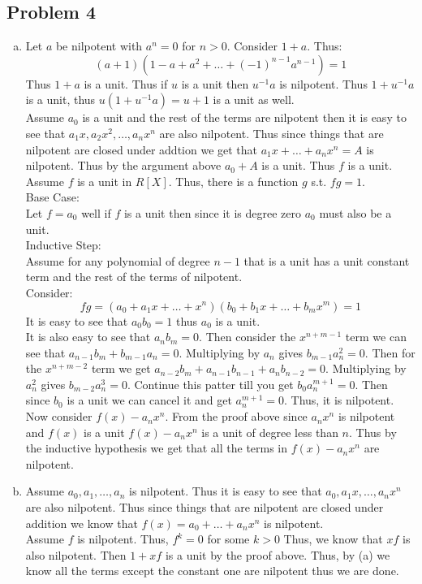 \documentclass[12pt, letterpaper]{article}
\theoremstyle{definition}
\begin{document}
\subsection*{Problem 4}
\begin{enumerate}[(a)]
    \item Let $a$ be nilpotent with $a^n=0$ for $n>0$. Consider $1+a$. Thus:
    \[(a+1)(1-a+a^2+\dots+(-1)^{n-1}a^{n-1})=1\]
    Thus $1+a$ is a unit. Thus if $u$ is a unit then $u^{-1}a$ is nilpotent. Thus $1+u^{-1}a$ is a unit, thus $u(1+u^{-1}a)=u+1$ is a unit as well.\\
    Assume $a_0$ is a unit and the rest of the terms are nilpotent then it is easy to see that $a_1x,a_2x^2,\dots,a_nx^n$ are also nilpotent. Thus since things that are nilpotent are closed under addtion we get that $a_1x+\dots+a_nx^n=A$ is nilpotent. Thus by the argument above $a_0+A$ is a unit. Thus $f$ is a unit.\\
    Assume $f$ is a unit in $R[X]$. Thus, there is a function $g$ s.t. $fg=1$.\\
    Base Case:\\
    Let $f=a_0$ well if $f$ is a unit then since it is degree zero $a_0$ must also be a unit.\\
    Inductive Step:\\
    Assume for any polynomial of degree $n-1$ that is a unit has a unit constant term and the rest of the terms of nilpotent.\\
    Consider:
    \[fg=(a_0+a_1x+\dots+x^n)(b_0+b_1x+\dots+b_mx^m)=1\]
    It is easy to see that $a_0b_0=1$ thus $a_0$ is a unit.\\
    It is also easy to see that $a_nb_m=0$. Then consider the $x^{n+m-1}$ term we can see that $a_{n-1}b_m+b_{m-1}a_n=0$. Multiplying by $a_n$ gives $b_{m-1}a_n^2=0$. Then for the $x^{n+m-2}$ term we get $a_{n-2}b_m+a_{n-1}b_{n-1}+a_nb_{n-2}=0$. Multiplying by $a_n^2$ gives $b_{m-2}a_n^3=0$. Continue this patter till you get $b_0a_n^{m+1}=0$. Then since $b_0$ is a unit we can cancel it and get $a_n^{m+1}=0$. Thus, it is nilpotent.\\
    Now consider $f(x)-a_nx^n$. From the proof above since $a_nx^n$ is nilpotent and $f(x)$ is a unit $f(x)-a_nx^n$ is a unit of degree less than $n$. Thus by the inductive hypothesis we get that all the terms in $f(x)-a_nx^n$ are nilpotent.
    \item Assume  $a_0,a_1,\dots,a_n$ is nilpotent. Thus it is easy to see that $a_0,a_1x,\dots,a_nx^n$ are also nilpotent. Thus since things that are nilpotent are closed under addition we know that $f(x)=a_0+\dots+a_nx^n$ is nilpotent.\\
    Assume $f$ is nilpotent. Thus, $f^k=0$ for some $k>0$ Thus, we know that $xf$ is also nilpotent. Then $1+xf$ is a unit by the proof above. Thus, by (a) we know all the terms except the constant one are nilpotent thus we are done.
\end{enumerate}
\end{document}
